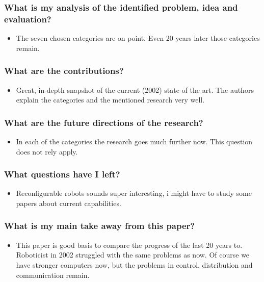 \begin{itemize}
    \end{itemize}
    \subsubsection*{What is my analysis of the identified problem, idea and evaluation?}
    \begin{itemize}
        \item The seven chosen categories are on point. Even 20 years later those categories remain.
    \end{itemize}
    \subsubsection*{What are the contributions?}
    \begin{itemize}
        \item Great, in-depth snapshot of the current (2002) state of the art. The authors explain the categories and the mentioned research very well.
    \end{itemize}
    \subsubsection*{What are the future directions of the research?}
    \begin{itemize}
        \item In each of the categories the research goes much further now. This question does not rely apply.
    \end{itemize}
    \subsubsection*{What questions have I left?}
    \begin{itemize}
        \item Reconfigurable robots sounds super interesting, i might have to study some papers about current capabilities.
    \end{itemize}
    \subsubsection*{What is my main take away from this paper?}
    \begin{itemize}
        \item This paper is good basis to compare the progress of the last 20 years to. Roboticist in 2002 struggled with the same problems as now. Of course we have stronger computers now, but the problems in control, distribution and communication remain.
    \end{itemize}
    
